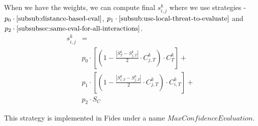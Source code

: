 When we have the weights, we can compute final $s^{k}_{i, j}$ where we use strategies - $p_{0} \cdot \ref{subsub:distance-based-eval}$, $p_{1} \cdot \ref{subsub:use-local-threat-to-evaluate}$ and $p_{2} \cdot \ref{subsubsec:same-eval-for-all-interactions}$. 
\begin{equation}
\begin{split}
    s^{k}_{i, j} &= \\
    &p_{0} \cdot \left[\left(1 - \frac{|{S}^{k}_{T} - S^{k}_{j, T}|}{2} \cdot C^{k}_{j, T}\right) \cdot C^{k}_{T}\right] + \\
    &p_{1} \cdot \left[\left(1 - \frac{|{S}^{k}_{i, T} - S^{k}_{j, T}|}{2} \cdot C^{k}_{j, T}\right) \cdot C^{k}_{i, T}\right] + \\
    &p_{2} \cdot S_{C}
\end{split}
\end{equation}

\noindent
This strategy is implemented in Fides under a name $MaxConfidenceEvaluation$.
